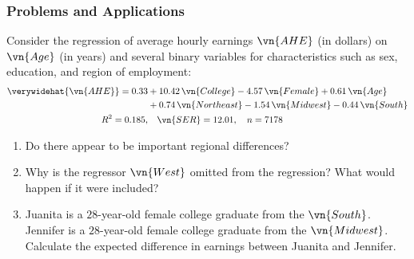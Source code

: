 

\begin{frame}
\frametitle{Problems and Applications}
Consider the regression of average hourly earnings $\vn{AHE}$ (in dollars) on $\vn{Age}$ (in years) and several binary variables for characteristics such as sex, education, and region of employment:
\begin{align*}
\verywidehat{\vn{AHE}} 
  = 0.33 & + 10.42\,\vn{College} - 4.57\,\vn{Female} + 0.61\,\vn{Age}\\ 
         & + 0.74\,\vn{Northeast} - 1.54\,\vn{Midwest} - 0.44\,\vn{South}\\
  \quad R^2 = 0.185, &
  \quad \vn{SER} = 12.01, 
  \quad n = 7178
\end{align*}
\vspace*{-2ex}
\begin{enumerate}
\item Do there appear to be important regional differences?
\item Why is the regressor $\vn{West}$ omitted from the regression? What would happen if it were included?
\item Juanita is a $28$-year-old female college graduate from the $\vn{South}$. Jennifer is a $28$-year-old female college graduate from the $\vn{Midwest}$. Calculate the expected difference in earnings between Juanita and Jennifer.
\end{enumerate}
\end{frame}
